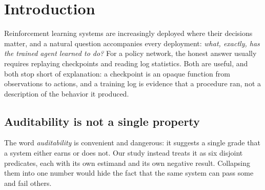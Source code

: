 \documentclass[11pt]{article}
\begin{document}
\begin{abstract}
We resist the temptation to collapse \emph{auditability} into a single score. The word bundles at
least six separately testable predicates---trace integrity, lossless coding, rule coverage,
behavioural agreement, composition quality, and value-model reliability---and \emph{passing
one test does not imply passing another}. This paper reports a bounded study that measures each
predicate on its own terms and states every prediction before seeing any result.
\end{abstract}

\section{Introduction}
\label{sec:intro}

Reinforcement learning systems are increasingly deployed where their decisions matter, and a natural
question accompanies every deployment: \emph{what, exactly, has the trained agent learned to do?}
For a policy network, the honest answer usually requires replaying checkpoints and reading log
statistics. Both are useful, and both stop short of explanation: a checkpoint is an opaque function
from observations to actions, and a training log is evidence that a procedure ran, not a description
of the behavior it produced.

\subsection{Auditability is not a single property}
\label{sec:intro:props}

The word \emph{auditability} is convenient and dangerous: it suggests a single grade that a system
either earns or does not. Our study instead treats it as six disjoint predicates, each with its own
estimand and its own negative result. Collapsing them into one number would hide the fact that the
same system can pass some and fail others.
\end{document}
